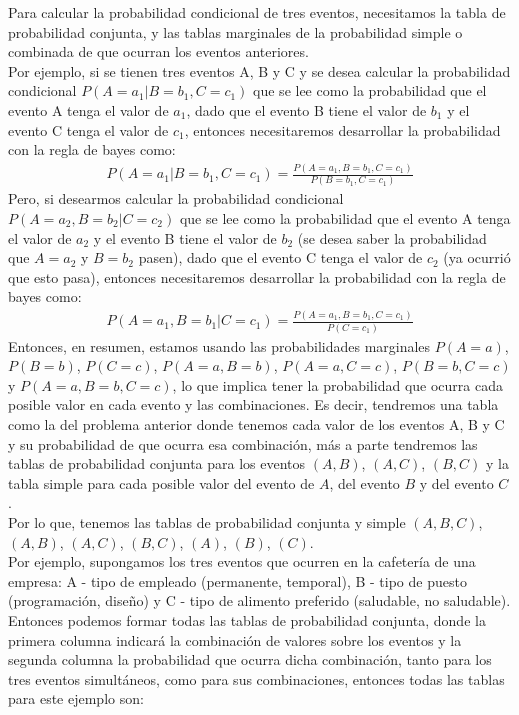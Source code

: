 \documentclass{article}
\begin{document}
Para calcular la probabilidad condicional de tres eventos, necesitamos la tabla de probabilidad conjunta, y las tablas marginales de la probabilidad simple o combinada de que ocurran los eventos anteriores.
\\[12pt]
Por ejemplo, si se tienen tres eventos A, B y C y se desea calcular la probabilidad condicional $P(A=a_1|B=b_1,C=c_1)$ que se lee como la probabilidad que el evento A tenga el valor de $a_1$, dado que el evento B tiene el valor de $b_1$ y el evento C tenga el valor de $c_1$, entonces necesitaremos desarrollar la probabilidad con la regla de bayes como:
\begin{equation*}
    \begin{aligned}
        P(A=a_1|B=b_1,C=c_1) = \frac{P(A=a_1,B=b_1,C=c_1)}{P(B=b_1,C=c_1)}
    \end{aligned}
\end{equation*}
Pero, si desearmos calcular la probabilidad condicional $P(A=a_2,B=b_2|C=c_2)$ que se lee como la probabilidad que el evento A tenga el valor de $a_2$ y el evento B tiene el valor de $b_2$ (se desea saber la probabilidad que $A=a_2$ y $B=b_2$ pasen), dado que el evento C tenga el valor de $c_2$ (ya ocurrió que esto pasa), entonces necesitaremos desarrollar la probabilidad con la regla de bayes como:
\begin{equation*}
    \begin{aligned}
        P(A=a_1,B=b_1|C=c_1) = \frac{P(A=a_1,B=b_1,C=c_1)}{P(C=c_1)}
    \end{aligned}
\end{equation*}
Entonces, en resumen, estamos usando las probabilidades marginales $P(A=a)$, $P(B=b)$, $P(C=c)$, $P(A=a,B=b)$, $P(A=a,C=c)$, $P(B=b,C=c)$ y $P(A=a,B=b,C=c)$, lo que implica tener la probabilidad que ocurra cada posible valor en cada evento y las combinaciones. Es decir, tendremos una tabla como la del problema anterior donde tenemos cada valor de los eventos A, B y C y su probabilidad de que ocurra esa combinación, más a parte tendremos las tablas de probabilidad conjunta para los eventos $(A, B)$, $(A, C)$, $(B,C)$ y la tabla simple para cada posible valor del evento de $A$, del evento $B$ y del evento $C$.
\\[12pt]
Por lo que, tenemos las tablas de probabilidad conjunta y simple $(A,B,C)$, $(A,B)$, $(A,C)$, $(B,C)$, $(A)$, $(B)$, $(C)$.
\\[12pt]
Por ejemplo, supongamos los tres eventos que ocurren en la cafetería de una empresa: A - tipo de empleado (permanente, temporal), B - tipo de puesto (programación, diseño) y C - tipo de alimento preferido (saludable, no saludable). Entonces podemos formar todas las tablas de probabilidad conjunta, donde la primera columna indicará la combinación de valores sobre los eventos y la segunda columna la probabilidad que ocurra dicha combinación, tanto para los tres eventos simultáneos, como para sus combinaciones, entonces todas las tablas para este ejemplo son:
\end{document}
